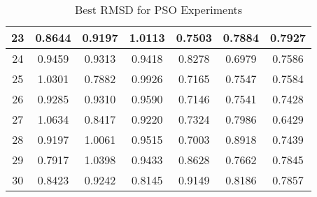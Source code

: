 \begin{table}
\begin{tabular}{ | c | c | c | c | c | c | c | }
		23 & 0.8644 & 0.9197 & 1.0113 & 0.7503 & 0.7884 & 0.7927 \\ \hline
		24 & 0.9459 & 0.9313 & 0.9418 & 0.8278 & 0.6979 & 0.7586 \\ \hline
		25 & 1.0301 & 0.7882 & 0.9926 & 0.7165 & 0.7547 & 0.7584 \\ \hline
		26 & 0.9285 & 0.9310 & 0.9590 & 0.7146 & 0.7541 & 0.7428 \\ \hline
		27 & 1.0634 & 0.8417 & 0.9220 & 0.7324 & 0.7986 & 0.6429 \\ \hline
		28 & 0.9197 & 1.0061 & 0.9515 & 0.7003 & 0.8918 & 0.7439 \\ \hline
		29 & 0.7917 & 1.0398 & 0.9433 & 0.8628 & 0.7662 & 0.7845 \\ \hline
		30 & 0.8423 & 0.9242 & 0.8145 & 0.9149 & 0.8186 & 0.7857 \\ \hline
	\end{tabular}
	\caption{Best RMSD for PSO Experiments}
	\label{table:appendix-pso-1}
\end{table}

